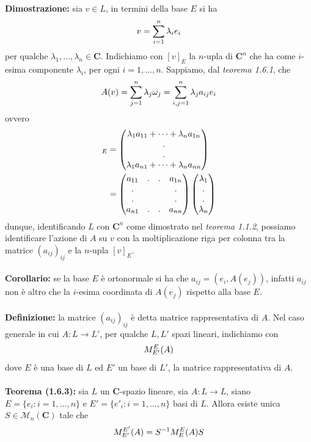 \documentclass{article}
\begin{document}
\textbf{Dimostrazione:} sia $v \in L$, in termini della base $E$ si ha
\begin{gather}
    v = \sum_{i = 1}^n \lambda_ie_i \notag
\end{gather}
per qualche $\lambda_1, \dots, \lambda_n \in \mathbf{C}$. Indichiamo con $[v]_E$ la $n$-upla di $\mathbf{C}^n$ che ha come $i$-esima componente $\lambda_i$, per ogni $i = 1, \dots, n$. Sappiamo, dal \textit{teorema 1.6.1}, che
\begin{gather}
    A(v) = \sum_{j = 1}^n \lambda_j\omega_j = \sum_{i, j = 1}^n \lambda_ja_{ij}e_i \notag
\end{gather}
ovvero
\begin{align}
    [v]_E &= \begin{pmatrix}
        \lambda_1a_{11} + \dots + \lambda_na_{1n} \\
        . \\
        . \\
        \lambda_{1}a_{n1} + \dots + \lambda_na_{nn}
    \end{pmatrix} \notag \\
    &= \begin{pmatrix}
        a_{11} & . & . & a_{1n} \\
        . & & & . \\
        . & & & . \\
        a_{n1} & . & . & a_{nn}
    \end{pmatrix}
    \begin{pmatrix}
        \lambda_1 \\
        . \\
        . \\
        \lambda_n
    \end{pmatrix} \notag
\end{align}
dunque, identificando $L$ con $\mathbf{C}^n$ come dimostrato nel \textit{teorema 1.1.2}, possiamo identificare l'azione di $A$ su $v$ con la moltiplicazione riga per colonna tra la matrice $(a_{ij})_{ij}$ e la $n$-upla $[v]_E$. \\ \\
\textbf{Corollario:} se la base $E$ è ortonormale si ha che $a_{ij} = (e_i, A(e_j))$, infatti $a_{ij}$ non è altro che la $i$-esima coordinata di $A(e_j)$ rispetto alla base $E$. \\ \\
\textbf{Definizione:} la matrice $(a_{ij})_{ij}$ è detta matrice rappresentativa di $A$. Nel caso generale in cui $A : L \longrightarrow L'$, per qualche $L, L'$ spazi lineari, indichiamo con
\begin{gather}
    M^E_{E'}(A) \notag
\end{gather}
dove $E$ è una base di $L$ ed $E'$ un base di $L'$, la matrice rappresentativa di $A$. \\ \\
\textbf{Teorema (1.6.3):} sia $L$ un $\mathbf{C}$-spazio lineare, sia $A : L \longrightarrow L$, siano $E = \{e_i : i = 1, \dots, n\}$ e $E' = \{e'_i : i = 1, \dots, n\}$ basi di $L$. Allora esiste unica $S \in \mathcal{M}_n(\mathbf{C})$ tale che
\begin{gather}
    M^{E'}_{E'}(A) = S^{-1} M^E_E(A) S \notag
\end{gather}
\end{document}
